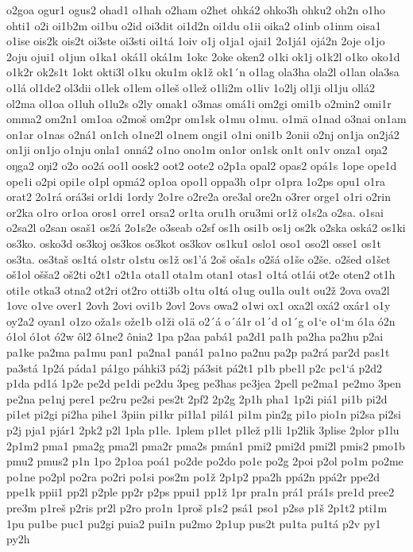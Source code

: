 o2goa
ogur1
ogus2
ohad1
o1hah
o2ham
o2het
ohká2
ohko3h
ohku2
oh2n
o1ho
ohti1
o2i
oi1b2m
oi1bu
o2id
oi3dit
oi1d2n
oi1du
o1ii
oika2
o1inb
o1inm
oisa1
o1ise
ois2k
ois2t
oi3ste
oi3sti
oi1tá
1oiv
o1j
o1ja1
ojai1
2o1já1
ojá2n
2oje
o1jo
2oju
ojui1
o1jun
o1ka1
oká1l
oká1m
1okc
2oke
oken2
o1ki
ok1j
o1k2l
o1ko
oko1d
o1k2r
ok2s1t
1okt
okti3l
o1ku
oku1m
ok1ž
ok1´n
o1lag
ola3ha
ola2l
o1lan
ola3sa
o1lá
ol1de2
ol3dii
o1lek
o1lem
o1leš
o1lež
o1li2m
o1liv
1o2lj
ol1ji
ol1ju
ollá2
ol2ma
ol1oa
o1luh
o1lu2s
o2ly
omak1
o3mas
omá1i
om2gi
omi1b
o2min2
omi1r
omma2
om2n1
om1oa
o2moš
om2pr
om1sk
o1mu
o1mu.
o1mä
o1nad
o3nai
on1am
on1ar
o1nas
o2ná1
on1ch
o1ne2l
o1nem
ongi1
o1ni
oni1b
2onii
o2nj
on1ja
on2já2
on1ji
on1jo
o1nju
onla1
onná2
o1no
ono1m
on1or
on1sk
on1t
on1v
onza1
oŋa2
oŋga2
oŋi2
o2o
oo2á
oo1l
oosk2
oot2
oote2
o2p1a
opal2
opas2
opá1s
1ope
ope1d
ope1i
o2pi
opi1e
o1pl
opmá2
op1oa
opo1l
oppa3h
o1pr
o1pra
1o2ps
opu1
o1ra
orat2
2o1rá
orá3si
or1di
1ordy
2o1re
o2re2a
ore3al
ore2n
o3rer
orge1
o1ri
o2rin
or2ka
o1ro
or1oa
oros1
orre1
orsa2
or1ta
oru1h
oru3mi
or1ž
o1s2a
o2sa.
o1sai
o2sa2l
o2san
osaš1
os2á
2o1s2e
o3seab
o2sf
os1h
osi1b
os1j
os2k
o2ska
oská2
os1ki
os3ko.
osko3d
os3koj
os3kos
os3kot
os3kov
os1ku1
oslo1
oso1
oso2l
osse1
os1t
os3ta.
os3taš
os1tá
o1str
o1stu
os1ž
os1'á
2oš
oša1s
o2šá
o1še
o2še.
o2šed
o1šet
oš1ol
ošša2
oš2ti
o2t1
o2t1a
ota1l
ota1m
otan1
otas1
o1tá
ot1ái
ot2e
oten2
ot1h
oti1e
otka3
otna2
ot2ri
ot2ro
otti3b
o1tu
o1ŧá
o1ug
ou1la
ou1t
ou2ž
2ova
ova2l
1ovc
o1ve
over1
2ovh
2ovi
ovi1b
2ovl
2ovs
owa2
o1wi
ox1
oxa2l
oxá2
oxár1
o1y
oy2a2
oyan1
o1zo
oža1s
ože1b
o1ži
o1ä
o2´á
o´á1r
o1´d
o1´g
o1`e
o1`m
ó1a
ó2n
ó1ol
ó1ot
ó2w
ôl2
ô1ne2
ônia2
1pa
p2aa
pabá1
pa2d1
pa1h
pa2ha
pa2hu
p2ai
pa1ke
pa2ma
pa1mu
pan1
pa2na1
paná1
pa1no
pa2nu
pa2p
pa2rá
par2d
pas1t
pa3stá
1p2á
páda1
pá1go
páhki3
pá2j
pá3sit
pá2t1
p1b
pbe1l
p2c
pc1`á
p2d2
p1da
pd1á
1p2e
pe2d
pe1di
pe2du
3peg
pe3has
pe3jea
2pell
pe2ma1
pe2mo
3pen
pe2na
pe1nj
pere1
pe2ru
pe2si
pes2t
2pf2
2p2g
2p1h
pha1
1p2i
piá1
pi1b
pi2d
pi1et
pi2gi
pi2ha
pihe1
3piin
pi1kr
pi1la1
pilá1
pi1m
pin2g
pi1o
pio1n
pi2sa
pi2si
p2j
pja1
pjár1
2pk2
p2l
1pla
p1le.
1plem
p1let
p1lež
p1li
1p2lik
3plise
2plor
p1lu
2p1m2
pma1
pma2g
pma2l
pma2r
pma2s
pmán1
pmi2
pmi2d
pmi2l
pmis2
pmo1b
pmu2
pmus2
p1n
1po
2p1oa
poá1
po2de
po2do
po1e
po2g
2poi
p2ol
po1m
po2me
po1ne
po2pl
po2ra
po2ri
po1si
pos2m
po1ž
2p1p2
ppa2h
ppá2n
ppá2r
ppe2d
ppe1k
ppii1
pp2l
p2ple
pp2r
p2ps
ppui1
pp1ž
1pr
pra1n
prá1
prá1s
pre1d
pree2
pre3m
p1reš
p2ris
pr2l
p2ro
pro1n
1proš
p1s2
psá1
pso1
p2sø
p1š
2p1t2
pti1m
1pu
pu1be
puc1
pu2gi
puia2
pui1n
pu2mo
2p1up
pus2t
pu1ta
pu1tá
p2v
py1
py2h
